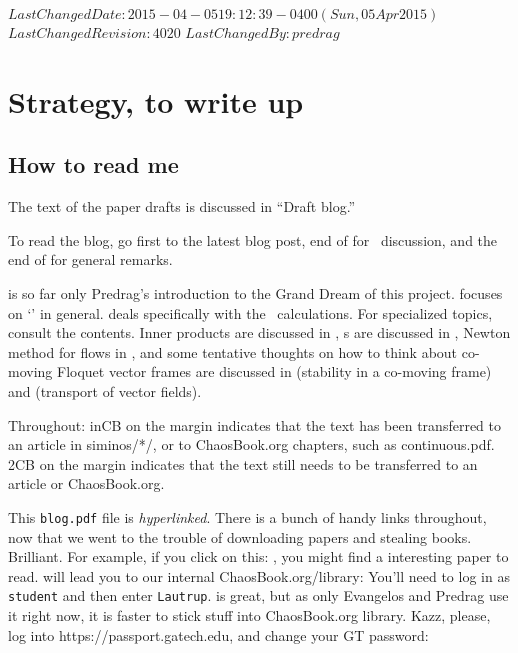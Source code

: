 \ifsvnmulti
 {$LastChangedDate: 2015-04-05 19:12:39 -0400 (Sun, 05 Apr 2015) $}
 {$LastChangedRevision: 4020 $} {$LastChangedBy: predrag $}
\fi

\chapter{Strategy, to write up}

\section{How to read me}

The text of the paper drafts is discussed in 
``Draft blog.''

To read the blog, go first to the latest blog post, end
of  for \KS\ discussion, and the end
of  for general remarks.

 is so far only Predrag's introduction to the Grand
Dream of this project.  focuses on `{\cLvs}' in general.
 deals specifically
with the \KS\ calculations.
For specialized topics, consult the contents. Inner products are
discussed in ,
{\PoincSec s} are discussed
in , Newton method for flows in
, and some tentative thoughts on how to think about
co-moving Floquet vector frames are discussed in
 (stability in a co-moving frame) and
 (transport of vector fields).

Throughout:  {\footnotesize inCB} on the margin                 \inCB
indicates that the text has been transferred to an
article in siminos/*/,  or to ChaosBook.org
chapters, such as
{continuous.pdf}.
 {\footnotesize 2CB} on the margin indicates that the text
still needs to be transferred to an article or ChaosBook.org.      \toCB

This \texttt{blog.pdf} file is \emph{hyperlinked}.
There is a bunch of handy links throughout,
now that we went to the trouble of downloading papers and stealing books. Brilliant.
For example, if you click on
this: , you might find a interesting paper to read.
 will
lead you to our internal ChaosBook.org/library:
You'll need to log in as \texttt{student} and then enter \texttt{Lautrup}.
 is great,
but as only Evangelos and Predrag use it right now,
it is faster to stick stuff into ChaosBook.org library.
%
Kazz, please, log into https://passport.gatech.edu, and change your GT password:


